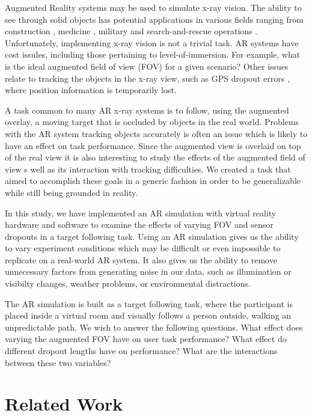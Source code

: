 \documentclass{acmsiggraph}                     %
\begin{document}

Augmented Reality systems may be used to simulate x-ray vision.  The ability to see through solid objects has potential applications in various fields ranging from construction \cite{Webster96augmentedreality}, medicine \cite{azuma95survey}, military \cite{Livingston02anaugmented} and search-and-rescue operations \cite{1528424}.  Unfortunately, implementing x-ray vision is not a trivial task.  AR systems have cost issules, including those pertaining to level-of-immersion.  For example, what is the ideal augmented field of view (FOV) for a given scenario?  Other issues relate to tracking the objects in the x-ray view, such as GPS dropout errors \cite{4079263}, where position information is temporarily lost.

A task common to many AR x-ray systems is to follow, using the augmented overlay, a moving target that is occluded by objects in the real world.  Problems with the AR system tracking objects accurately is often an issue which is likely to have an effect on task performance.  Since the augmented view is overlaid on top of the real view it is also interesting to study the effects of the augmented field of view s well as its interaction with tracking difficulties.  We created a task that aimed to accomplish these goals in a generic fashion in order to be generalizable while still being grounded in reality.

In this study, we have implemented an AR simulation with virtual reality hardware and software to examine the effects of varying FOV and sensor dropouts in a target following task.  Using an AR simulation gives us the ability to vary experiment conditions which may be difficult or even impossible to replicate on a real-world AR system.  It also gives us the ability to remove unnecessary factors from generating noise in our data, such as illumination or visibilty changes, weather problems, or environmental distractions. 

The AR simulation is built as a target following task, where the participant is placed inside a virtual room and visually follows a person outside, walking an unpredictable path.  We wish to answer the following questions.  What effect does varying the augmented FOV have on user task performance?  What effect do different dropout lengths have on performance?  What are the interactions between these two variables?

\section{Related Work}
\end{document}
